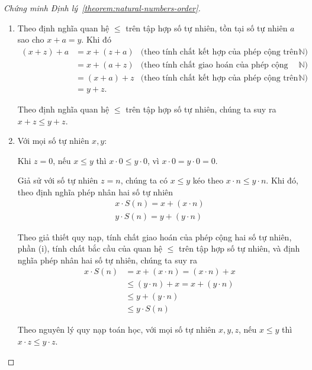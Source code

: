 \begin{proof}[Chứng minh Định lý~\ref{theorem:natural-numbers-order}]
    \begin{enumerate}[label={(\roman*)}]
        \item Theo định nghĩa quan hệ $\leq$ trên tập hợp số tự nhiên, tồn tại số tự nhiên $a$ sao cho $x + a = y$. Khi đó
              \begin{align*}
                  (x + z) + a & = x + (z + a) & \text{(theo tính chất kết hợp của phép cộng trên $\mathbb{N}$)}   \\
                              & = x + (a + z) & \text{(theo tính chất giao hoán của phép cộng trên $\mathbb{N}$)} \\
                              & = (x + a) + z & \text{(theo tính chất kết hợp của phép cộng trên $\mathbb{N}$)}   \\
                              & = y + z.
              \end{align*}

              Theo định nghĩa quan hệ $\leq$ trên tập hợp số tự nhiên, chúng ta suy ra $x + z\leq y + z$.
        \item Với mọi số tự nhiên $x, y$:

              Khi $z = 0$, nếu $x\leq y$ thì $x\cdot 0\leq y\cdot 0$, vì $x\cdot 0 = y\cdot 0 = 0$.

              Giả sử với số tự nhiên $z = n$, chúng ta có $x\leq y$ kéo theo $x\cdot n\leq y\cdot n$. Khi đó, theo định nghĩa phép nhân hai số tự nhiên
              \[
                  \begin{split}
                      x\cdot S(n) = x + (x\cdot n) \\
                      y\cdot S(n) = y + (y\cdot n)
                  \end{split}
              \]

              Theo giả thiết quy nạp, tính chất giao hoán của phép cộng hai số tự nhiên, phần (i), tính chất bắc cầu của quan hệ $\leq$ trên tập hợp số tự nhiên, và định nghĩa phép nhân hai số tự nhiên, chúng ta suy ra
              \begin{align*}
                  x\cdot S(n) & = x + (x\cdot n) = (x\cdot n) + x    \\
                              & \leq (y\cdot n) + x = x + (y\cdot n) \\
                              & \leq y + (y\cdot n)                  \\
                              & \leq y\cdot S(n)
              \end{align*}

              Theo nguyên lý quy nạp toán học, với mọi số tự nhiên $x, y, z$, nếu $x\leq y$ thì $x\cdot z\leq y\cdot z$.
    \end{enumerate}
\end{proof}

